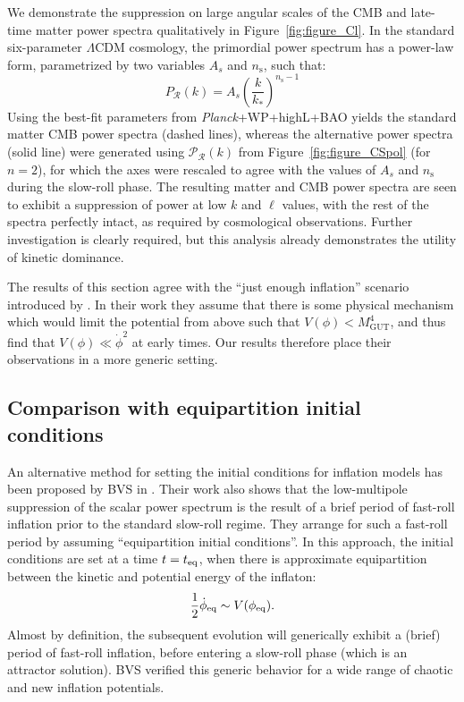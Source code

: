 We demonstrate the suppression on large angular scales of the CMB and late-time matter power spectra qualitatively in Figure~\ref{fig:figure_Cl}.  In the standard six-parameter $\Lambda$CDM cosmology, the primordial power spectrum has a power-law form, parametrized by two variables $A_s$ and $n_\mathrm{s}$, such that:
%
\begin{equation}
  P_\mathcal{R}(k) = A_s{\left(\frac{k}{k_*}\right)}^{n_\mathrm{s}-1}
\end{equation}
%
Using the best-fit parameters from {\em Planck\/}+WP+highL+BAO \citep{planck_collaboration_planck_2013} yields the standard matter CMB power spectra (dashed lines), whereas the alternative power spectra (solid line) were generated using $\mathcal{P}_\mathcal{R}(k)$ from Figure~\ref{fig:figure_CSpol} (for $n=2$), for which the axes were rescaled to agree with the values of $A_s$ and $n_\mathrm{s}$ during the slow-roll phase. The resulting matter and CMB power spectra are seen to exhibit a suppression of power at low $k$ and $\ell$ values, with the rest of the spectra perfectly intact, as required by cosmological observations.  Further investigation is clearly required, but this analysis already demonstrates the utility of kinetic dominance.

The results of this section agree with the ``just enough inflation'' scenario introduced by \citet{Ramirez_excluded_2009,Ramirez_predictions_2012,Ramirez_low_2012}.  In their work they assume that there is some physical mechanism which would limit the potential from above such that $V(\phi)<M_\mathrm{GUT}^4$, and thus find that $V(\phi)\ll\dot{\phi}^2$ at early times. Our results therefore place their observations in a more generic setting.


\subsection{Comparison with equipartition initial conditions}
\label{sec:comparison}

An alternative method for setting the initial conditions for inflation models has been proposed by BVS in \citep{boyanovsky_cmb_2006}. Their work also shows that the low-multipole suppression of the scalar power spectrum is the result of a brief period of fast-roll inflation prior to the standard slow-roll regime. They arrange for such a fast-roll period by assuming ``equipartition initial conditions''. In this approach, the initial conditions are set at a time $t=t_{\mathrm{eq}}$, when there is approximate equipartition between the kinetic and potential energy of the inflaton:
%
\begin{equation}
  \frac{1}{2}\dot{\phi}_{\mathrm{eq}} \sim V(\phi_{\mathrm{eq}}).
  \label{eqn:bvsbc}
\end{equation}
%
Almost by definition, the subsequent evolution will generically exhibit a (brief) period of fast-roll inflation, before entering a slow-roll phase (which is an attractor solution). BVS verified this generic behavior for a wide range of chaotic and new inflation potentials.

